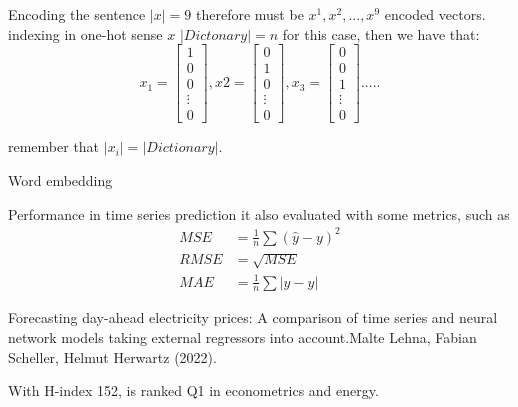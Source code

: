 \documentclass{beamer}
\begin{document}
\begin{frame}{Encoding the sentence}
$\vert x \vert  = 9 $ therefore must be $x^{1},x^{2},...,x^{9}$ encoded vectors.
indexing in one-hot sense $x$
$\vert Dictonary \vert = n$ for this case, then we have that:
\[
x_{1}= 
\begin{bmatrix}
1 \\
0 \\
0 \\
\vdots\\
0
\end{bmatrix}
,x2= 
\begin{bmatrix}
0 \\
1 \\
0 \\
\vdots\\
0
\end{bmatrix}
,x_{3} = \begin{bmatrix}
0 \\
0 \\
1 \\
\vdots\\
0
\end{bmatrix}
.....
\] 

remember that $\vert x_{i} \vert = \vert Dictionary \vert$.


\end{frame}

\begin{frame}{Word embedding}

\end{frame}



\begin{frame}{Performance in time series prediction}
it also evaluated with some metrics, such as
\begin{equation*}
\begin{align*}
MSE &= \frac{1}{n} \sum (\hat{y} -y )^{2} \\
RMSE &= \sqrt{MSE} \\
MAE &= \frac{1}{n} \sum \vert \hat{y} -y \vert
\end{align*}
\end{equation*}
\end{frame}








\begin{frame}{Forecasting day-ahead electricity prices: A comparison of time series and
neural network models taking external regressors into account.}{Malte Lehna, Fabian Scheller, Helmut Herwartz (2022).}

With H-index 152, is ranked Q1 in econometrics and energy.

\end{frame}
\end{document}
